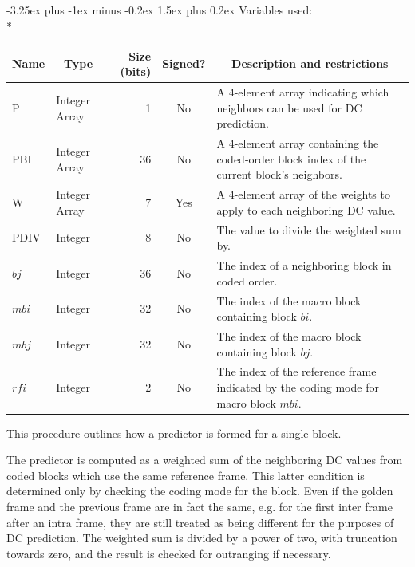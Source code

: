 \documentclass[9pt,letterpaper]{book}
\makeatletter
\newcommand{\idx}[1]{{\ensuremath{\mathit{#1}}}}
\newcommand{\bi}{\idx{bi}}
\newcommand{\bj}{\idx{bj}}
\newcommand{\mbi}{\idx{mbi}}
\newcommand{\mbj}{\idx{mbj}}
\newcommand{\rfi}{\idx{rfi}}
\newcommand{\bitvar}[1]{\ensuremath{\mathbf{\bm{#1}}}}
\newcommand{\locvar}[1]{\ensuremath{\mathrm{#1}}}
\numberwithin{equation}{chapter}
\numberwithin{figure}{chapter}
\numberwithin{table}{chapter}
\renewcommand{\paragraph}{\@startsection{paragraph}{4}{0ex}%
 {-3.25ex plus -1ex minus -0.2ex}%
 {1.5ex plus 0.2ex}%
 {\normalfont\normalsize\bfseries}}
\makeatother
\begin{document}
\paragraph{Variables used:}\hfill\\*
\begin{tabularx}{\textwidth}{@{}llrcX@{}}\toprule
\multicolumn{1}{c}{Name} &
\multicolumn{1}{c}{Type} &
\multicolumn{1}{p{30pt}}{\centering Size (bits)} &
\multicolumn{1}{c}{Signed?} &
\multicolumn{1}{c}{Description and restrictions} \\\midrule\endhead
\locvar{P}        & \multicolumn{1}{p{40pt}}{Integer Array} &
                               1 & No  & A 4-element array indicating which
 neighbors can be used for DC prediction. \\
\locvar{PBI}      & \multicolumn{1}{p{40pt}}{Integer Array} &
                              36 & No  & A 4-element array containing the
 coded-order block index of the current block's neighbors. \\
\locvar{W}        & \multicolumn{1}{p{40pt}}{Integer Array} &
                               7 & Yes & A 4-element array of the weights to
 apply to each neighboring DC value. \\
\locvar{PDIV}     & Integer &  8 & No  & The value to divide the weighted sum
 by. \\
\locvar{\bj}      & Integer & 36 & No  & The index of a neighboring block in
 coded order. \\
\locvar{\mbi}     & Integer & 32 & No  & The index of the macro block
 containing block \bitvar{\bi}. \\
\locvar{\mbj}     & Integer & 32 & No  & The index of the macro block
 containing block \locvar{\bj}. \\
\locvar{\rfi}     & Integer &  2 & No  & The index of the reference frame
 indicated by the coding mode for macro block \locvar{\mbi}. \\
\bottomrule\end{tabularx}
\medskip

This procedure outlines how a predictor is formed for a single block.

The predictor is computed as a weighted sum of the neighboring DC values from
 coded blocks which use the same reference frame.
This latter condition is determined only by checking the coding mode for the
 block.
Even if the golden frame and the previous frame are in fact the same, e.g. for
 the first inter frame after an intra frame, they are still treated as being
 different for the purposes of DC prediction.
The weighted sum is divided by a power of two, with truncation towards zero,
 and the result is checked for outranging if necessary.
\end{document}
